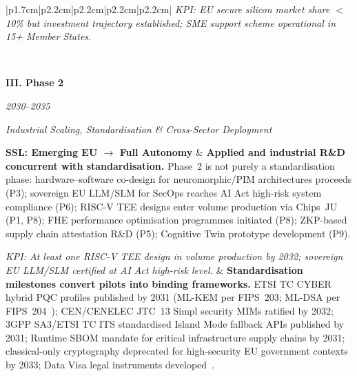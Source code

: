 \begin{longtable}{|p{1.7cm}|p{2.2cm}|p{2.2cm}|p{2.2cm}|p{2.2cm}|}
\smallskip
\textit{KPI: EU secure silicon market share $<$10\% but investment
trajectory established; SME support scheme operational in 15+
Member States.}
\\
\hline

\\
\hline

\textbf{III. Phase 2}

\smallskip
\textit{2030--2035}

\smallskip
\textit{Industrial Scaling, Standardisation \& Cross-Sector Deployment}

\smallskip
\colorbox{ssltrans}{\footnotesize\textbf{SSL: Emerging EU $\to$ Full Autonomy}}
&
\footnotesize
\textbf{Applied and industrial R\&D concurrent with standardisation.}
Phase~2 is not purely a standardisation phase: hardware--software
co-design for neuromorphic/PIM architectures proceeds (P3); sovereign
EU LLM/SLM for SecOps reaches AI Act high-risk system compliance (P6);
RISC-V TEE designs enter volume production via Chips~JU (P1, P8); FHE
performance optimisation programmes initiated (P8); ZKP-based supply
chain attestation R\&D (P5); Cognitive Twin prototype development (P9).

\smallskip
\textit{KPI: At least one RISC-V TEE design in volume production by
2032; sovereign EU LLM/SLM certified at AI Act high-risk level.}
&
\footnotesize
\textbf{Standardisation milestones convert pilots into binding frameworks.}
ETSI TC CYBER hybrid PQC profiles published by 2031 (ML-KEM per
FIPS~203; ML-DSA per FIPS~204~\cite{fips203,fips204});
CEN/CENELEC JTC~13 Simpl security MIMs ratified by 2032; 3GPP SA3/ETSI
TC ITS standardised Island Mode fallback APIs published by 2031;
Runtime SBOM mandate for critical infrastructure supply chains by 2031;
classical-only cryptography deprecated for high-security EU government
contexts by 2033; Data Visa legal instruments developed~\cite{snsju}.


\end{longtable}
